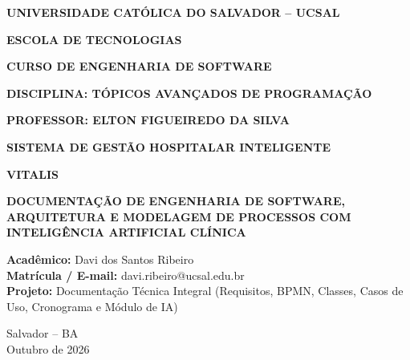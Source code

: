 \documentclass[12pt,a4paper]{article}
\begin{document}
\begin{titlepage}
    \centering
    \vspace*{0.8cm}
    {\large \textbf{UNIVERSIDADE CATÓLICA DO SALVADOR -- UCSAL}\par}
    \vspace{0.25cm}
    {\large \textbf{ESCOLA DE TECNOLOGIAS}\par}
    \vspace{0.25cm}
    {\large \textbf{CURSO DE ENGENHARIA DE SOFTWARE}\par}
    \vspace{0.25cm}
    {\large \textbf{DISCIPLINA: TÓPICOS AVANÇADOS DE PROGRAMAÇÃO}\par}
    \vspace{0.25cm}
    {\large \textbf{PROFESSOR: ELTON FIGUEIREDO DA SILVA}\par}
    \vspace{2.8cm}

    {\Large \textbf{\color{vitalisdark}SISTEMA DE GESTÃO HOSPITALAR INTELIGENTE}\par}
    \vspace{0.6cm}
    {\Huge \textbf{\color{vitalisblue}VITALIS}\par}
    \vspace{0.8cm}
    {\large \textbf{DOCUMENTAÇÃO DE ENGENHARIA DE SOFTWARE, ARQUITETURA E MODELAGEM DE PROCESSOS COM INTELIGÊNCIA ARTIFICIAL CLÍNICA}\par}
    \vspace{2.8cm}

    \begin{flushright}
        \begin{minipage}{0.55\textwidth}
            \small
            \textbf{Acadêmico:} Davi dos Santos Ribeiro\\
            \textbf{Matrícula / E-mail:} davi.ribeiro@ucsal.edu.br\\
            \textbf{Projeto:} Documentação Técnica Integral (Requisitos, BPMN, Classes, Casos de Uso, Cronograma e Módulo de IA)
        \end{minipage}
    \end{flushright}

    \vfill
    {\large Salvador -- BA\\ Outubro de 2026\par}
\end{titlepage}
\end{document}
